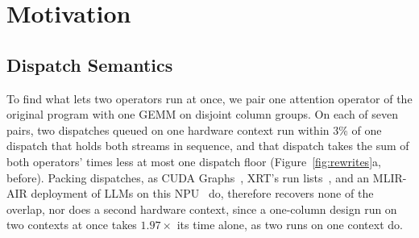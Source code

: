 \section{Motivation}
\label{sec:motivation}

\subsection{Dispatch Semantics}
\label{subsec:semantics}

To find what lets two operators run at once, we pair one attention operator of the original program with one GEMM on disjoint column groups.
On each of seven pairs, two dispatches queued on one hardware context run within 3\% of one dispatch that holds both streams in sequence, and that dispatch takes the sum of both operators' times less at most one dispatch floor (Figure~\ref{fig:rewrites}a, before).
Packing dispatches, as CUDA Graphs~\citep{nvidia-cudagraphs}, XRT's run lists~\citep{xrt-repo}, and an MLIR-AIR deployment of LLMs on this NPU~\citep{li2026agentnpu} do, therefore recovers none of the overlap, nor does a second hardware context, since a one-column design run on two contexts at once takes $1.97\times$ its time alone, as two runs on one context do.
